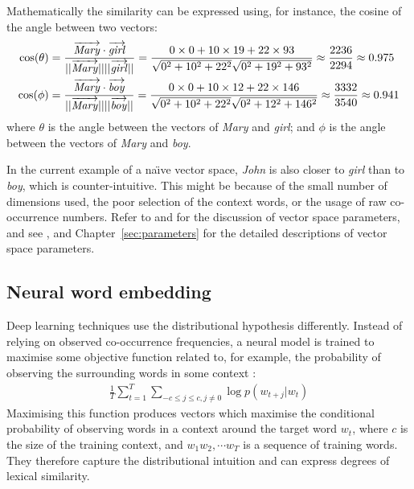 Mathematically the similarity can be expressed using, for instance, the cosine of the angle between two vectors:
%
\begin{align*}
\cos(\theta) &=
\frac{\ov{\mathit{Mary}}\cdot\ov{\mathit{girl}}}
{||\ov{\mathit{Mary}}||||\ov{\mathit{girl}}||} =
%
\frac{0\times0 + 10\times19 + 22\times93}
{\sqrt{0^2 + 10^2 + 22^2}\sqrt{0^2 + 19^2 + 93^2}} \approx
\frac{2236}{2294} \approx 0.975
 \\
\cos(\phi) &=
\frac{\ov{\mathit{Mary}}\cdot\ov{\mathit{boy}}}
{||\ov{\mathit{Mary}}||||\ov{\mathit{boy}}||} =
%
\frac{0\times0 + 10\times12 + 22\times146}
{\sqrt{0^2 + 10^2 + 22^2}\sqrt{0^2 + 12^2 + 146^2}} \approx
\frac{3332}{3540} \approx 0.941
\end{align*}
%
where $\theta$ is the angle between the vectors of \textit{Mary} and \textit{girl}; and $\phi$ is the angle between the vectors of \textit{Mary} and \textit{boy}.

In the current example of a na{\"\i}ve vector space, \textit{John} is also closer to \textit{girl} than to \textit{boy}, which is counter-intuitive. This might be because of the small number of dimensions used, the poor selection of the context words, or the usage of raw co-occurrence numbers. Refer to  and  for the discussion of vector space parameters, and see ,  and
%
Chapter~\ref{sec:parameters}
%
for the detailed descriptions of vector space parameters.

\subsection{Neural word embedding}
\label{sec:neural-embedding}

Deep learning techniques use the distributional hypothesis differently. Instead of relying on observed co-occurrence frequencies, a neural model is trained to maximise some objective function related to, for example, the probability of observing the surrounding words in some context \cite{mikolov2013distributed}:
%
\begin{align}
 \frac{1}{T}\sum^{T}_{t=1}\sum_{-c \leq j \leq c, j\neq0} \log p(w_{t+j}|w_t)
  \label{eq:objective-func}
\end{align}
%
\noindent
Maximising this function produces vectors which maximise the
conditional probability of observing words in a context around the
target word $w_t$, where $c$ is the size of the training context, and
$w_1 w_2, \cdots w_T$ is a sequence of training words. They therefore
capture the distributional intuition and can express degrees of
lexical similarity.

